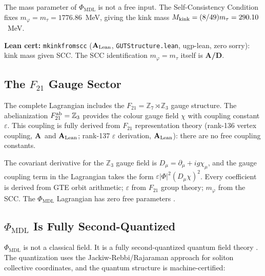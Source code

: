 \documentclass[11pt,openany]{book}
\theoremstyle{remark}
\newcommand{\PHIMDL}{\Phi_{\mathrm{MDL}}}
\newcommand{\ZS}{\mathbb{Z}_7}
\newcommand{\lean}[1]{%
  \penalty-100
  \begingroup\def\_{\textunderscore\allowbreak}\texttt{#1}\endgroup}
\newcommand{\Mkink}{M_{\rm kink}}
\newcommand{\CatA}{\textbf{A}}
\newcommand{\CatAL}{\ensuremath{\textbf{A}_{\rm Lean}}}
\newcommand{\CatAD}{\textbf{A/D}}
\begin{document}
\begin{tcolorbox}[colback=orange!5,colframe=orange!60,
  title={Result: Self-Consistency Condition (\CatAD\ bridge; \CatAL\ downstream)}]
The mass parameter of $\PHIMDL$ is not a free input.
The Self-Consistency Condition fixes $m_\varphi = m_\tau = 1776.86$~MeV,
giving the kink mass $\Mkink = (8/49)m_\tau = 290.10$~MeV.

\smallskip\noindent
\textbf{Lean cert:} \lean{mkink\_from\_scc} (\CatAL, \texttt{GUTStructure.lean},
ugp-lean, zero sorry): kink mass given SCC.
The SCC identification $m_\varphi = m_\tau$ itself is \CatAD.
\end{tcolorbox}

\subsection*{The $F_{21}$ Gauge Sector}

The complete Lagrangian includes the $F_{21} = \ZS\rtimes\mathbb{Z}_3$ gauge structure.
The abelianization $F_{21}^{\rm ab} = \mathbb{Z}_3$ provides the colour gauge field
$\chi$ with coupling constant $\varepsilon$.
This coupling is fully derived from $F_{21}$ representation theory
(rank-136 vertex coupling, \CatA\ and \CatAL; rank-137 $\varepsilon$ derivation,
\CatAL): there are no free coupling constants.

The covariant derivative for the $\mathbb{Z}_3$ gauge field is
$D_\mu = \partial_\mu + ig\chi_\mu$, and the gauge coupling term in the Lagrangian
takes the form $\varepsilon|\Phi|^2(D_\mu\chi)^2$.
Every coefficient is derived from GTE orbit arithmetic;
$\varepsilon$ from $F_{21}$ group theory; $m_\varphi$ from the SCC.
The $\PHIMDL$ Lagrangian has zero free parameters \cite{SpivackPhiMDLField}.

\subsection*{$\PHIMDL$ Is Fully Second-Quantized}

$\PHIMDL$ is not a classical field.
It is a fully second-quantized quantum field theory \cite{SpivackPhiMDLField,SpivackCompleteness}.
The quantization uses the Jackiw-Rebbi/Rajaraman approach for soliton collective coordinates,
and the quantum structure is machine-certified:
\end{document}
